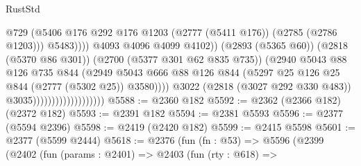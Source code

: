 \begin{lexlean}{RustStd}
\begin{coremodule}
                                                        @729
                                                        (@5406
                                                          @176
                                                          @292
                                                          @176
                                                          @1203
                                                          (@2777 (@5411 @176))
                                                          (@2785 (@2786 @1203)))
                                                        @5483))))
                                                @4093
                                                @4096
                                                @4099
                                                @4102))
                                            (@2893 (@5365 @60))
                                            (@2818 (@5370 @86 @301))
                                            (@2700 (@5377 @301 @62 @835 @735))
                                            (@2940
                                              @5043
                                              @88
                                              @126
                                              @735
                                              @844
                                              (@2949
                                                @5043
                                                @666
                                                @88
                                                @126
                                                @844
                                                (@5297
                                                  @25
                                                  @126
                                                  @25
                                                  @844
                                                  (@2777 (@5302 @25))
                                                  @3580))))
                                          @3022
                                          (@2818 (@3027 @292 @330 @483))
                                          @3035)))))))))))))))))))
@5588 := @2360 @182
@5592 := @2362 (@2366 @182) (@2372 @182)
@5593 := @2391 @182
@5594 := @2381 @5593
@5596 := @2377 (@5594 @2396)
@5598 := @2419 (@2420 @182)
@5599 := @2415 @5598
@5601 := @2377 (@5599 @2444)
@5618 := @2376
    (fun (fn : @53) =>
    @5596
      (@2399
        (@2402
          (fun (params : @2401) =>
          @2403
            (fun (rty : @618) =>

\end{coremodule}
\end{lexlean}

